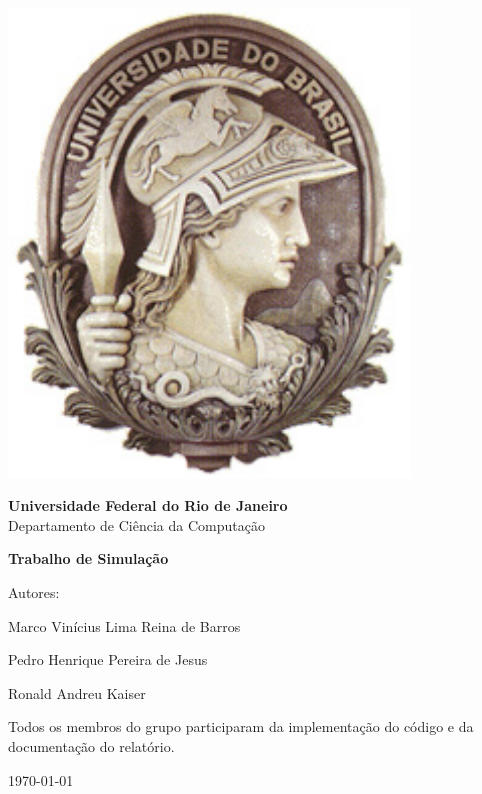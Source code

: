 \documentclass[12pt, a4paper, onecolumn]{report}
\begin{document}
 

\begin{titlepage}

\begin{minipage}{0.2\linewidth}
 \includegraphics[width=0.8\textwidth]{minerva.jpg}
\end{minipage}
\begin{minipage}{0.8\linewidth}
 \textbf{Universidade Federal do Rio de Janeiro}\\
 Departamento de Ciência da Computação\\
\end{minipage}

\begin{center}
\vspace{2cm}
\Large
\textbf{Trabalho de Simulação}
\vspace{0.5cm}
\normalsize
\end{center}
\vfill

\begin{flushright}
Autores:

\vspace{0.125cm}

Marco Vinícius Lima Reina de Barros

\vspace{0.25cm}

Pedro Henrique Pereira de Jesus

\vspace{0.25cm}

Ronald Andreu Kaiser
\end{flushright}
\vspace{0.70cm}
\begin{center}
Todos os membros do grupo participaram da implementação do código e da documentação do relatório.

\vspace{0.25cm}

\today
\end{center}

\vspace{2cm}

\end{titlepage}

\tableofcontents







\end{document}
